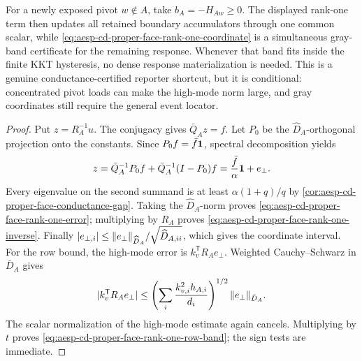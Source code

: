 \begin{corollary}
For a newly exposed pivot \(w\notin A\), take
\(b_A=-H_{Aw}\geq0\).  The displayed rank-one term then updates all retained
boundary accumulators through one common scalar, while
\cref{eq:aesp-cd-proper-face-rank-one-coordinate} is a simultaneous gray-band
certificate for the remaining response.  Whenever that band fits inside the
finite KKT hysteresis, no dense response materialization is needed.  This is
a genuine conductance-certified reporter shortcut, but it is conditional:
concentrated pivot loads can make the high-mode norm large, and gray
coordinates still require the general event locator.
\end{corollary}

\begin{proof}
Put \(z=R_A^{-1}u\).  The conjugacy gives
\(\bar Q_Az=f\).  Let \(P_0\) be the
\(\widehat D_A\)-orthogonal projection onto the constants.  Since
\(P_0f=\bar f\mathbf{1}\), spectral decomposition yields
\begin{equation*}
 z=\bar Q_A^{-1}P_0f+\bar Q_A^{-1}(I-P_0)f
  =\frac{\bar f}{\alpha}\mathbf{1}+e_\perp.
\end{equation*}
Every eigenvalue on the second summand is at least
\(\alpha(1+q)/q\) by
\cref{cor:aesp-cd-proper-face-conductance-gap}.  Taking the
\(\widehat D_A\)-norm proves
\cref{eq:aesp-cd-proper-face-rank-one-error}; multiplying by \(R_A\) proves
\cref{eq:aesp-cd-proper-face-rank-one-inverse}.  Finally
\(|e_{\perp,i}|\leq
\lVert e_\perp\rVert_{\widehat D_A}/\sqrt{\widehat D_{A,ii}}\), which gives the
coordinate interval.
For the row bound, the high-mode error is
\(k_v^{\mathsf T}R_Ae_\perp\).  Weighted Cauchy--Schwarz in \(\bar D_A\)
gives
\begin{equation*}
 |k_v^{\mathsf T}R_Ae_\perp|
 \leq
 \left(\sum_i\frac{k_{v,i}^2h_{A,i}}{d_i}\right)^{1/2}
 \lVert e_\perp\rVert_{\bar D_A}.
\end{equation*}
The scalar normalization of the high-mode estimate again cancels.  Multiplying
by \(t\) proves \cref{eq:aesp-cd-proper-face-rank-one-row-band}; the sign tests
are immediate.
\end{proof}

